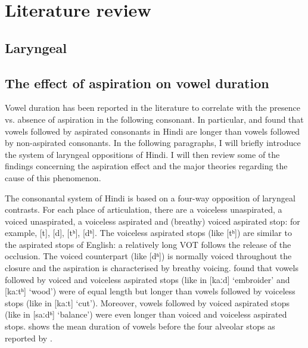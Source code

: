 \chapter{Literature review}
\label{c:review}

\section{Laryngeal}



\section{The effect of aspiration on vowel duration}
\label{s:aspiration}

Vowel duration has been reported in the literature to correlate with the presence vs. absence of aspiration in the following consonant.
In particular, \citet{maddieson1976} and \citet{durvasula2012} found that vowels followed by aspirated consonants in Hindi are longer than vowels followed by non-aspirated consonants.
In the following paragraphs, I will briefly introduce the system of laryngeal oppositions of Hindi.
I will then review some of the findings concerning the aspiration effect and the major theories regarding the cause of this phenomenon.

The consonantal system of Hindi is based on a four-way opposition of laryngeal contrasts.
For each place of articulation, there are a voiceless unaspirated, a voiced unaspirated, a voiceless aspirated and (breathy) voiced aspirated stop: for example, [t], [d], [tʰ], [dʱ].
The voiceless aspirated stops (like [tʰ]) are similar to the aspirated stops of English: a relatively long VOT follows the release of the occlusion.
The voiced counterpart (like [dʱ]) is normally voiced throughout the closure and the aspiration is characterised by breathy voicing.
\citet{maddieson1976} found that vowels followed by voiced and voiceless aspirated stops (like in [kaːd] `embroider' and [kaːtʰ] `wood') were of equal length but longer than vowels followed by voiceless stops (like in [kaːt] `cut').
Moreover, vowels followed by voiced aspirated stops (like in [saːdʱ] `balance') were even longer than voiced and voiceless aspirated stops.
 shows the mean duration of vowels before the four alveolar stops as reported by \citet[47]{maddieson1976}.


